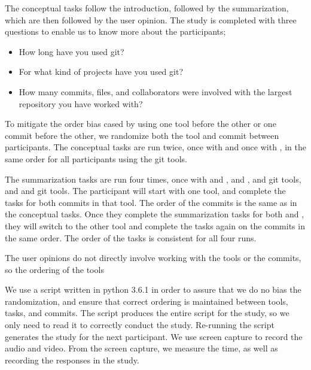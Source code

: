 The conceptual tasks follow the introduction, followed by the
summarization, which are then followed by the user opinion. The study is
completed with three questions to enable us to know more about the
participants;

\begin{itemize}
  \item How long have you used git?
  \item For what kind of projects have you used git?
  \item How many commits, files, and collaborators were involved with
    the largest repository you have worked with?
\end{itemize}



To mitigate the order bias cased by using one tool before the other or
one commit before the other, we randomize both the tool and commit
between participants. The conceptual tasks are run twice, once with
\comA and once with \comB, in the same order for all participants using
the git tools.

 The summarization tasks are run
four times, once with \comA and \tool, \comB and \tool, \comA and git
tools, and \comB and git tools. The participant will start with one
tool, and complete the tasks for both commits in that tool. The order of
the commits is the same as in the conceptual tasks. Once they complete
the summarization tasks for both \comA and \comB, they will switch to
the other tool and complete the tasks again on the commits in the same
order. The order of the tasks is consistent for all four runs.

The user opinions do not directly involve working with the tools or the
commits, so the ordering of the tools


We use a script written in python 3.6.1 in order to assure that we do no
bias the randomization, and ensure that correct ordering is maintained
between tools, tasks, and commits. The script produces the entire script
for the study, so we only need to read it to correctly conduct the
study. Re-running the script generates the study for the next
participant. We use screen capture to record the audio and video. From
the screen capture, we measure the time, as well as recording the
responses in the study.

